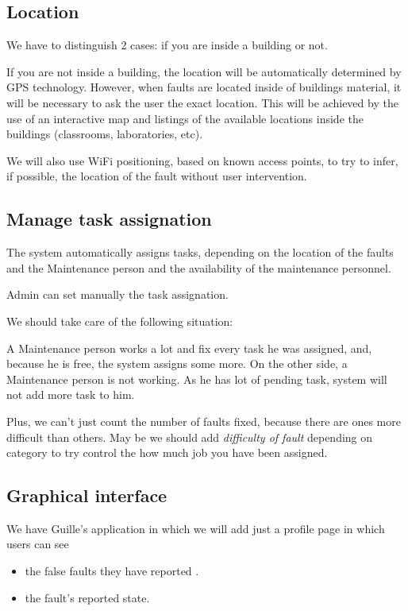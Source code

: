 \subsection{Location}

We have to distinguish 2 cases: if you are inside a building or not.

If you are not inside a building, the location will be automatically determined by GPS technology. However, when faults are located inside of buildings material, it will be necessary to ask the user the exact location. This will be achieved by the use of an interactive map and listings of the available locations inside the buildings (classrooms, laboratories, etc). 

We will also use WiFi positioning, based on known access points, to try to infer, if possible, the location of the fault without user intervention.

\subsection{Manage task assignation}
The system automatically assigns tasks, depending on the location of the faults and the Maintenance person and the availability of the maintenance personnel.

Admin can set manually the task assignation.

We should take care of the following situation:

A Maintenance person works a lot and fix every task he was assigned, and, because he is free, the system assigns some more. On the other side, a Maintenance person is not working. As he has lot of pending task, system will not add more task to him. 

Plus, we can't just count the number of faults fixed, because there are ones more difficult than others. May be we should add \textit{difficulty of fault} depending on category to try control the how much job you have been assigned.

\subsection{Graphical interface}
We have Guille's application in which we will add just a profile page in which users can see
\begin{itemize}
\item the false faults they have reported .
\item the fault's reported state.
\end{itemize}

